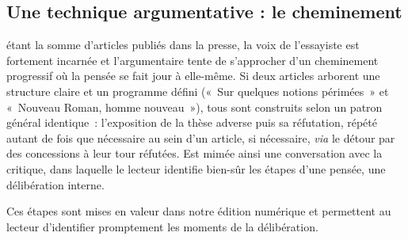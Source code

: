 \subsection{Une technique argumentative : le cheminement}
\label{rhétoChemin}

\punr{} étant la somme d'articles publiés dans la presse, la voix de l'essayiste est fortement incarnée et l'argumentaire tente de s'approcher d'un cheminement progressif où la pensée se fait jour à elle-même. Si deux articles arborent une structure claire et un programme défini («~Sur quelques notions périmées~» et «~Nouveau Roman, homme nouveau~»), tous sont construits selon un patron général identique~: l'exposition de la thèse adverse puis sa réfutation, répété autant de fois que nécessaire au sein d'un article, si nécessaire, \textit{via} le détour par des concessions à leur tour réfutées. Est mimée ainsi une conversation avec la critique, dans laquelle le lecteur identifie bien-sûr les étapes d'une pensée, une délibération interne.

Ces étapes sont mises en valeur dans notre édition numérique et permettent au lecteur d'identifier promptement les moments de la délibération.


